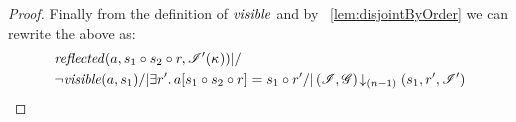 \begin{lemma}
\begin{proof}
Finally from the definition of $\mathit{visible}$ and by \lem~\ref{lem:disjointByOrder} we can rewrite the above as: 
%
%
\begin{align*}
  &\m{reflected}(a,s_1 \composeL s_2 \composeL r,\lmod'(\ca{})) |/\null \nonumber \\
%  
  &\neg\m{visible}(a,s_1) /| \exsts{r'} a[s_1 \composeL s_2 \composeL r] = s_1 \composeL r' /| \extendsAMUpto{\lmod, \gmod}{(n-1)}{s_1}{r'}{\lmod'}  \nonumber
\end{align*}

\end{proof}
\end{lemma}

